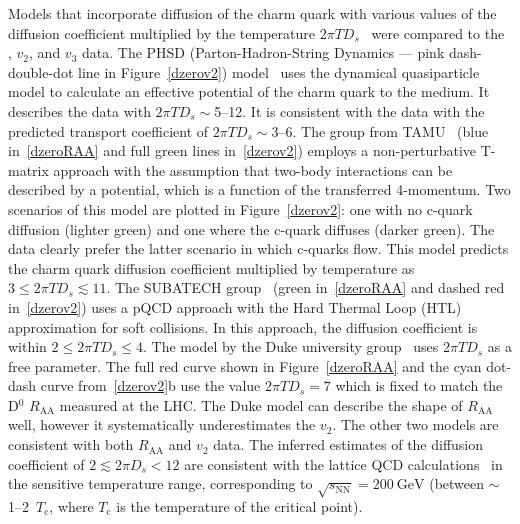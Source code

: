 Models that incorporate diffusion of the charm quark with various values of the diffusion coefficient multiplied by 
the temperature $2\pi T D_s$~\cite{PHSD2014,LBT, LBTprivate, TAMU,PHSD2015,SUBATECHvn,SUBATECHquenching,Duke,Duke2015} were compared to the \Raa,  $v_2$, and $v_3$ data. The PHSD 
(Parton-Hadron-String Dynamics --- pink dash-double-dot line
in Figure~\ref{dzerov2}) model~\cite{PHSD2014,PHSD2015} uses the dynamical quasiparticle model to calculate 
an effective potential of the charm quark to the medium. It describes the data with $2\pi T D_s \sim$5--12.
It is consistent with the data with the predicted transport coefficient of $2\pi T D_s \sim$3--6.
The group from TAMU~\cite{TAMU} (blue in~\ref{dzeroRAA} and full green lines in~\ref{dzerov2}) employs
a non-perturbative T-matrix approach with the assumption
that two-body interactions can be described by a potential, which is a function of the transferred
4-momentum. Two scenarios of this model are plotted in Figure~\ref{dzerov2}: one with no c-quark diffusion (lighter green) 
and one where the c-quark diffuses (darker green). The data clearly prefer the latter scenario in which
c-quarks flow.
This model predicts the charm quark diffusion coefficient multiplied by temperature as
$3 \leq 2\pi T D_s \lesssim 11$\@.
The SUBATECH group~\cite{SUBATECHvn}\nocite{SUBATECHquenching} (green in~\ref{dzeroRAA} and dashed red in~\ref{dzerov2}) uses a pQCD approach 
with the Hard Thermal Loop (HTL) approximation for soft collisions.
In this approach, the diffusion coefficient is within $2 \leq 2\pi T D_s \leq 4$\@.
The model by the Duke university group~\cite{Duke,Duke2015} uses
$2\pi T D_s$ as a free parameter. The full red curve shown in Figure~\ref{dzeroRAA} and the cyan dot-dash curve from~\ref{dzerov2}b use
the value $2\pi T D_s = 7$ which is fixed to match the D$^0$ $R_\mathrm{AA}$ measured at
the LHC\@. The Duke model can describe the shape of $R_\mathrm{AA}$ well, however it systematically
underestimates the $v_2$\@. The other two models are consistent with 
both $R_\mathrm{AA}$ and $v_2$ data. The inferred estimates of the diffusion coefficient of $2 \lesssim 2 \pi D_s < 12$ are 
consistent with the lattice QCD calculations~\cite{DingLattice,BanerjeeLattice}\nocite{continuumEstimate,Tmatrix,SvetinskyDiffusion} 
in the sensitive temperature range, corresponding to $\sqrt{s_\mathrm{NN}} = \SI{200}{\giga\electronvolt}$ (between $\sim$1--2~$T_\mathrm{c}$, 
where $T_\mathrm{c}$ is the temperature of the critical point). 

